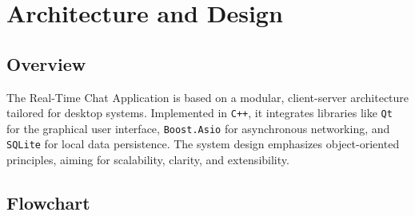 \documentclass[12pt,a4paper]{article}
\begin{document}
  \section{Architecture and Design}

  \subsection{Overview}
  The Real-Time Chat Application is based on a modular, client-server architecture tailored for desktop systems. Implemented in \texttt{C++}, it integrates libraries like \texttt{Qt} for the graphical user interface, \texttt{Boost.Asio} for asynchronous networking, and \texttt{SQLite} for local data persistence. The system design emphasizes object-oriented principles, aiming for scalability, clarity, and extensibility.
  


\subsection{Flowchart}
\end{document}
